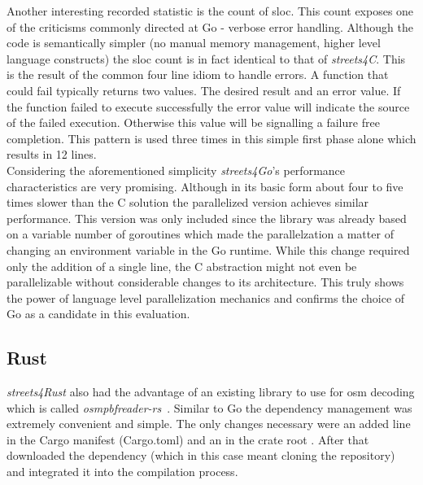 Another interesting recorded statistic is the count of \acrlong{sloc}. This count exposes one of the criticisms commonly directed at Go - verbose error handling. Although the code is semantically simpler (no manual memory management, higher level language constructs) the \gls{sloc} count is in fact identical to that of \textit{streets4C}. This is the result of the common four line idiom to handle errors. A function that could fail typically returns two values. The desired result and an error value. If the function failed to execute successfully the error value will indicate the source of the failed execution. Otherwise this value will be  signalling a failure free completion. This pattern is used three times in this simple first phase alone which results in 12 lines.
\\


Considering the aforementioned simplicity \textit{streets4Go}'s performance characteristics are very promising. Although in its basic form about four to five times slower than the C solution the parallelized version achieves similar performance. This version was only included since the library was already based on a variable number of \glspl{goroutine} which made the parallelzation a matter of changing an environment variable in the Go runtime. While this change required only the addition of a single line, the C abstraction  might not even be parallelizable without considerable changes to its architecture. This truly shows the power of language level parallelization mechanics and confirms the choice of Go as a candidate in this evaluation.

\subsection{Rust}
\label{subsec:Implementation::Counting::Rust}

\textit{streets4Rust} also had the advantage of an existing library to use for \gls{osm} decoding which is called \textit{osmpbfreader-rs}~. Similar to Go the dependency management was extremely convenient and simple. The only changes necessary were an added line in the Cargo manifest (Cargo.toml) and an  in the crate root . After that  downloaded the dependency (which in this case meant cloning the  repository) and integrated it into the compilation process.


